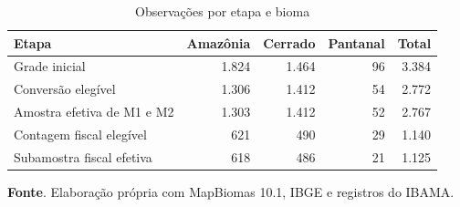 \begin{table}[htbp]
\centering
\footnotesize
\setlength{\tabcolsep}{4pt}
\captionstyle{\centering}
\normalcaption
\caption{Observações por etapa e bioma}
\label{tab:ap-h1b-amostra-quali}
\begin{tabular}{lrrrr}
\toprule
Etapa & Amazônia & Cerrado & Pantanal & Total \\
\midrule
Grade inicial & 1.824 & 1.464 & 96 & 3.384 \\
Conversão elegível & 1.306 & 1.412 & 54 & 2.772 \\
Amostra efetiva de M1 e M2 & 1.303 & 1.412 & 52 & 2.767 \\
Contagem fiscal elegível & 621 & 490 & 29 & 1.140 \\
Subamostra fiscal efetiva & 618 & 486 & 21 & 1.125 \\
\bottomrule
\end{tabular}
\par\smallskip\begin{minipage}{\textwidth}\footnotesize
\SingleSpacing
\noindent\textbf{Fonte}. Elaboração própria com MapBiomas 10.1, IBGE e registros do IBAMA.
\end{minipage}
\end{table}

\FloatBarrier


